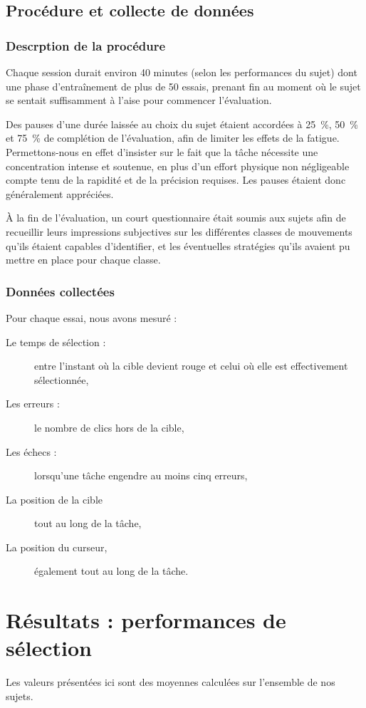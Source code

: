 	\subsection{Procédure et collecte de données}
	\subsubsection{Descrption de la procédure}
	Chaque session durait environ 40 minutes (selon les performances du sujet) dont une phase d'entraînement de plus de 50 essais, prenant fin au moment où le sujet se sentait suffisamment à l'aise pour commencer l'évaluation.
	
	Des pauses d'une durée laissée au choix du sujet étaient accordées à 25~\%{}, 50~\%{} et 75~\%{} de complétion de l'évaluation, afin de limiter les effets de la fatigue. Permettons-nous en effet d'insister sur le fait que la tâche nécessite une concentration intense et soutenue, en plus d'un effort physique non négligeable compte tenu de la rapidité et de la précision requises. Les pauses étaient donc généralement appréciées.
	
	À la fin de l'évaluation, un court questionnaire était soumis aux sujets afin de recueillir leurs impressions subjectives sur les différentes \og classes \fg{} de mouvements qu'ils étaient capables d'identifier, et les éventuelles stratégies qu'ils avaient pu mettre en place pour chaque classe.
	
	\subsubsection{Données collectées}
	Pour chaque essai, nous avons mesuré :
	
	\begin{description}
		\item[Le temps de sélection :] entre l'instant où la cible devient rouge et celui où elle est effectivement sélectionnée,
		\item[Les erreurs :] le nombre de clics hors de la cible,
		\item[Les échecs :] lorsqu'une tâche engendre au moins cinq erreurs,
		\item[La position de la cible] tout au long de la tâche,
		\item[La position du curseur,] également tout au long de la tâche.
	\end{description}

\section{Résultats : performances de sélection}
	Les valeurs présentées ici sont des moyennes calculées sur l'ensemble de nos sujets.
	
